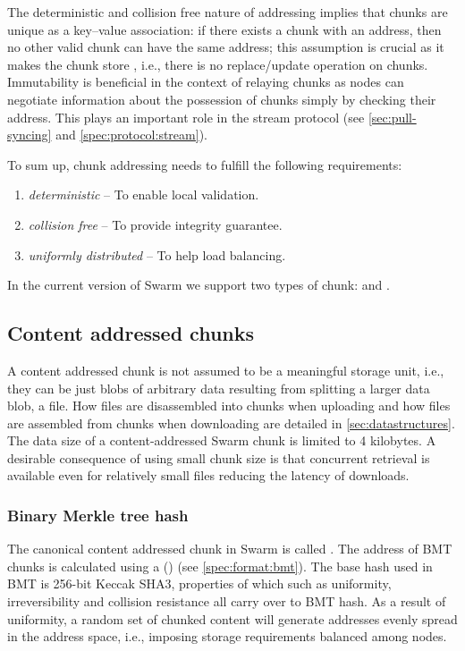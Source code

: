 The deterministic and collision free nature of addressing implies that chunks are unique as a key--value association: if there exists a chunk with an address, then no other valid chunk can have the same address; this assumption is crucial as it makes the chunk store , i.e., there is no replace/update operation on chunks. Immutability is beneficial in the context of relaying chunks as nodes can negotiate information about the possession of chunks simply by checking their address. This plays an important role in the stream protocol (see \ref{sec:pull-syncing} and \ref{spec:protocol:stream}).

To sum up, chunk addressing needs to fulfill the following requirements:

\begin{enumerate}
    \item \emph{deterministic} -- To enable local validation.
    \item \emph{collision free} -- To provide integrity guarantee.
    \item \emph{uniformly distributed} -- To help load balancing.
\end{enumerate}

In the current version of Swarm we support two types of chunk:  and . 

\subsection{Content addressed  chunks}\label{sec:content-addressed-chunks}

A content addressed chunk is not assumed to be a meaningful storage unit, i.e., they can be just blobs of arbitrary data resulting from splitting a larger data blob, a file. How files are disassembled into chunks when uploading and how files are assembled from chunks when downloading are detailed in \ref{sec:datastructures}. The data size of a content-addressed Swarm chunk is limited to 4 kilobytes. A desirable consequence of using small chunk size is that concurrent retrieval is available even for relatively small files reducing the latency of downloads. 

\subsubsection{Binary Merkle tree hash}

The canonical content addressed chunk in Swarm is called .
The address of BMT chunks is calculated using a  () (see \ref{spec:format:bmt}). The base hash used in BMT is 256-bit Keccak SHA3, properties of which such as uniformity, irreversibility and collision resistance all carry over to BMT hash. As a result of uniformity, a random set of chunked content will generate addresses evenly spread in the address space, i.e., imposing storage requirements balanced among nodes.

